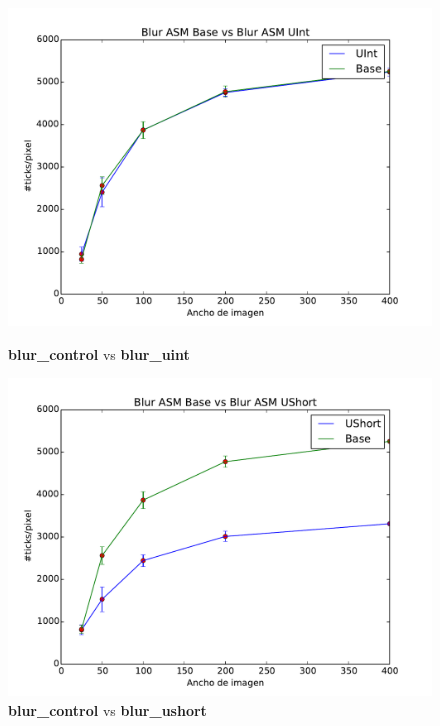 \begin{figure}[H]
	\centering
	\begin{minipage}{.5\textwidth}
		\centering
		\includegraphics[width=\linewidth]{../graficos/blur_uint.pdf}
		\caption{\textbf{blur\_control} vs \textbf{blur\_uint}}
		\label{fig:blur_uint}
	\end{minipage}\hfill
	\begin{minipage}{.5\textwidth}
		\centering
		\includegraphics[width=\linewidth]{../graficos/blur_ushort.pdf}
		\caption{\textbf{blur\_control} vs \textbf{blur\_ushort}}
		\label{fig:blur_ushort}
	\end{minipage}
\end{figure}

